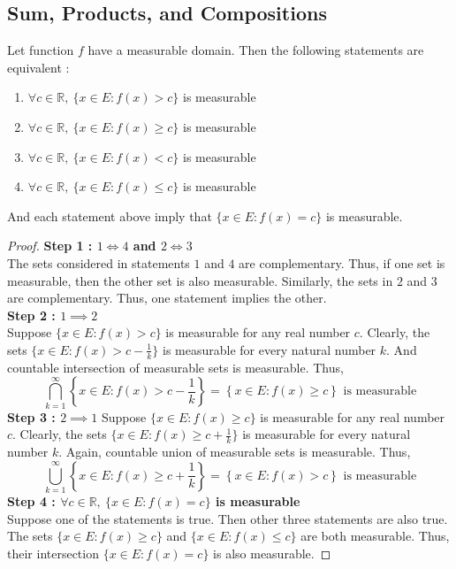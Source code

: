 \subsection{Sum, Products, and Compositions}
\begin{theorem}
	Let function $f$ have a measurable domain.
	Then the following statements are equivalent :
	\begin{enumerate}
		\item $\forall c \in \mathbb{R},\ \{ x \in E : f(x) > c\}$ is measurable
		\item $\forall c \in \mathbb{R},\ \{ x \in E : f(x) \ge c\}$ is measurable
		\item $\forall c \in \mathbb{R},\ \{ x \in E : f(x) < c\}$ is measurable
		\item $\forall c \in \mathbb{R},\ \{ x \in E : f(x) \le c\}$ is measurable
	\end{enumerate}
	And each statement above imply that $\{ x \in E : f(x) = c \}$ is measurable.
	\label{thm:4measurablesets}
\end{theorem}
\begin{proof}
	\textbf{Step 1 : $1 \iff 4$ and $2 \iff 3$}\\
	The sets considered in statements $1$ and $4$ are complementary.
	Thus, if one set is measurable, then the other set is also measurable.
	Similarly, the sets in $2$ and $3$ are complementary.
	Thus, one statement implies the other.\\

	\textbf{Step 2 : $1 \implies 2$}\\
	Suppose $\{ x \in E : f(x) > c \}$ is measurable for any real number $c$.
	Clearly, the sets $\{ x \in E : f(x) > c-\frac{1}{k} \}$ is measurable for every natural number $k$.
	And countable intersection of measurable sets is measurable.
	Thus,
	\[ \bigcap_{k=1}^\infty \left\{ x \in E : f(x) > c-\frac{1}{k} \right\} = \left\{ x \in E : f(x) \ge c \right\} \text{ is measurable} \]
	\textbf{Step 3 : $2 \implies 1$}
	Suppose $\{ x \in E : f(x) \ge c \}$ is measurable for any real number $c$.
	Clearly, the sets $\{ x \in E : f(x) \ge c+\frac{1}{k} \}$ is measurable for every natural number $k$.
	Again, countable union of measurable sets is measurable. Thus,
	\[ \bigcup_{k=1}^\infty \left\{ x \in E : f(x) \ge c+\frac{1}{k} \right\} = \left\{ x \in E : f(x) > c \right\} \text{ is measurable} \]
	\textbf{Step 4 : $\forall c \in \mathbb{R},\ \{ x \in E : f(x) =c \}$ is measurable}\\
	Suppose one of the statements is true.
	Then other three statements are also true.
	The sets $\{ x \in E : f(x) \ge c \}$ and $\{ x \in E : f(x) \le c \}$ are both measurable.
	Thus, their intersection $\{ x \in E : f(x) = c \}$ is also measurable.
\end{proof}


